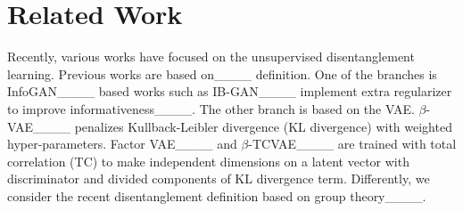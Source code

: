 \section{Related Work}

Recently, various works have focused on the unsupervised disentanglement learning. 
Previous works are based on____ definition.
One of the branches %
is InfoGAN____ based works such as IB-GAN____ implement extra regularizer to improve informativeness____.
The other branch is based on the VAE.
$\beta$-VAE____ penalizes Kullback-Leibler divergence (KL divergence) with weighted hyper-parameters.
Factor VAE____ and $\beta$-TCVAE____ are trained with total correlation (TC) to make independent dimensions on a latent vector with discriminator and divided components of KL divergence term.
Differently, we consider the recent disentanglement definition based on group theory____.

